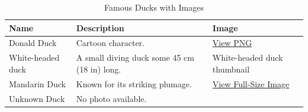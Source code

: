 \documentclass[11pt,a4paper]{article}
\begin{document}
\begin{table}[h]
\caption{Famous Ducks with Images}
\begin{tabular}{|l|l|l|}
\hline
Name & Description & Image \\ \hline
Donald Duck & Cartoon character. & \href{https://en.wikipedia.org/wiki/Donald\_Duck\#/media/File:Donald\_Duck\_angry\_transparent\_background.png}{View PNG} \\ \hline
White-headed duck & A small diving duck some 45 cm (18 in) long. & %
White-headed duck thumbnail \\ \hline
Mandarin Duck & Known for its striking plumage. & \href{https://upload.wikimedia.org/wikipedia/commons/thumb/7/75/Mandarin\_duck\_\%28Aix\_galericulata\%29.jpg/250px-Mandarin\_duck\_\%28Aix\_galericulata\%29.jpg}{View Full-Size Image} \\ \hline
Unknown Duck & No photo available. &  \\ \hline
\end{tabular}
\end{table}
\end{document}
